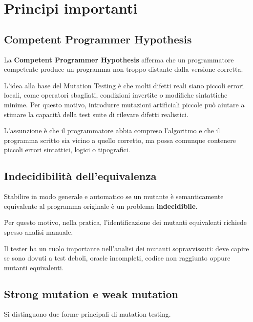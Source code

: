 \section{Principi importanti}

\subsection{Competent Programmer Hypothesis}

La \textbf{Competent Programmer Hypothesis} afferma che un programmatore competente produce un programma non troppo distante dalla versione corretta.

L'idea alla base del Mutation Testing è che molti difetti reali siano piccoli errori locali, come operatori sbagliati, condizioni invertite o modifiche sintattiche minime. Per questo motivo, introdurre mutazioni artificiali piccole può aiutare a stimare la capacità della test suite di rilevare difetti realistici.

\begin{notaprof}
L'assunzione è che il programmatore abbia compreso l'algoritmo e che il programma scritto sia vicino a quello corretto, ma possa comunque contenere piccoli errori sintattici, logici o tipografici.
\end{notaprof}

\subsection{Indecidibilità dell'equivalenza}

Stabilire in modo generale e automatico se un mutante è semanticamente equivalente al programma originale è un problema \textbf{indecidibile}.

Per questo motivo, nella pratica, l'identificazione dei mutanti equivalenti richiede spesso analisi manuale.

\begin{notaesame}
Il tester ha un ruolo importante nell'analisi dei mutanti sopravvissuti: deve capire se sono dovuti a test deboli, oracle incompleti, codice non raggiunto oppure mutanti equivalenti.
\end{notaesame}

\subsection{Strong mutation e weak mutation}

Si distinguono due forme principali di mutation testing.

